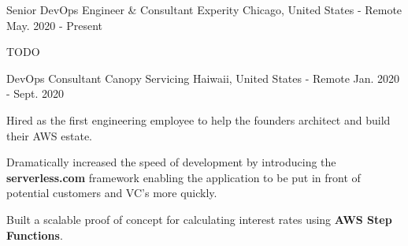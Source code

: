 
\begin{cventries}

  \cventry
    {Senior DevOps Engineer & Consultant} %
    {Experity} %
    {Chicago, United States - Remote} %
    {May. 2020 - Present} %
    {
      \begin{cvitems} %
        \item {TODO}
      \end{cvitems}
    }

  \cventry
    {DevOps Consultant} %
    {Canopy Servicing} %
    {Haiwaii, United States - Remote} %
    {Jan. 2020 - Sept. 2020} %
    {
      \begin{cvitems} %
        \item {Hired as the first engineering employee to help the founders architect and build their AWS estate.}
        \item {Dramatically increased the speed of development by introducing the \textbf{serverless.com} framework enabling the application to be put in front of potential customers and VC's more quickly.}
        \item {Built a scalable proof of concept for calculating interest rates using \textbf{AWS Step Functions}.}
      \end{cvitems}
    }


\end{cventries}
